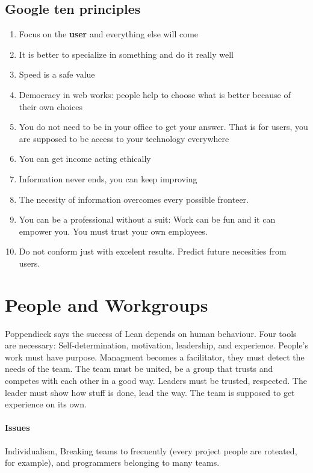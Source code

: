 \documentclass[a4paper,12pt]{article}
\begin{document}
\subsection{Google ten principles}
\begin{enumerate}
\item Focus on the \textbf{user} and everything else will come
\item It is better to specialize in something and do it really well
\item Speed is a safe value
\item Democracy in web works: people help to choose what is better because of their own choices
\item You do not need to be in your office to get your answer. That is for users, you are supposed to be access to your technology everywhere
\item You can get income acting ethically
\item Information never ends, you can keep improving
\item The necesity of information overcomes every possible fronteer.
\item You can be a professional without a suit: Work can be fun and it can empower you. You must trust your own employees.
\item Do not conform just with excelent results. Predict future necesities from users.
  
\end{enumerate}

\section{People and Workgroups}


Poppendieck says the success of Lean depends on human behaviour. Four tools are necessary: Self-determination, motivation, leadership, and experience. People's work must have purpose. Managment becomes a facilitator, they must detect the needs of the team. The team must be united, be a group that trusts and competes with each other in a good way. Leaders must be trusted, respected. The leader must show how stuff is done, lead the way. The team is supposed to get experience on its own.

\paragraph{Issues}

Individualism, Breaking teams to frecuently (every project people are roteated, for example), and programmers belonging to many teams.
\end{document}
